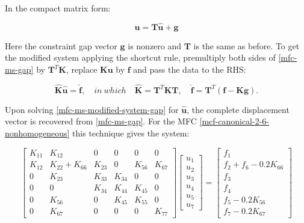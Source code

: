 \documentclass[10pt,b5paper,titlepage]{book}
\begin{document}
In the compact matrix form:

\begin{equation}\label{mfc-ms-gap}
    \mathbf{u} = \mathbf{T} \mathbf{\hat{u}} + \mathbf{g}
\end{equation}

Here the constraint gap vector $ \mathbf{g} $ is nonzero and $ \mathbf{T} $ is the same
as before. To get the modified system applying the shortcut rule, premultiply
both sides of \eqref{mfc-ms-gap} by $ \mathbf{T}^T \mathbf{K} $, replace
$ \mathbf{K} \mathbf{u} $ by $ \mathbf{f} $ and pass the data to the RHS:

\begin{equation}\label{mfc-ms-modified-system-gap}
    \mathbf{\hat{K}} \mathbf{\hat{u}} = \mathbf{\hat{f}}, \quad
    in\ which \quad \mathbf{\hat{K}} = \mathbf{T}^T \mathbf{K} \mathbf{T}, \quad
    \mathbf{\hat{f}} = \mathbf{T}^T \left( \mathbf{f} -\mathbf{K} \mathbf{g} \right).
\end{equation}

Upon solving \eqref{mfc-ms-modified-system-gap} for $ \mathbf{\hat{u}} $, the
complete displacement vector is recovered from \eqref{mfc-ms-gap}. For the MFC
\eqref{mcf-canonical-2-6-nonhomogeneous} this technique gives the system:

\begin{equation}
    \begin{bmatrix}
        K_{11} & K_{12} & 0 & 0 & 0 & 0 \\
        K_{12} & K_{22} + K_{66} & K_{23} & 0 & K_{56} & K_{67} \\
        0 & K_{23} & K_{33} & K_{34} & 0 & 0 \\
        0 & 0 & K_{34} & K_{44} & K_{45} & 0 \\
        0 & K_{56} & 0 & K_{45} & K_{55} & 0 \\
        0 & K_{67} & 0 & 0 & 0 & K_{77}
    \end{bmatrix}
    \begin{bmatrix}
        u_1 \\
        u_2 \\
        u_3 \\
        u_4 \\
        u_5 \\
        u_7
    \end{bmatrix}
    = \begin{bmatrix}
        f_1 \\
        f_2 + f_6 - 0.2 K_{66} \\
        f_3 \\
        f_4 \\
        f_5 - 0.2 K_{56} \\
        f_7 - 0.2 K_{67}
    \end{bmatrix}
\end{equation}
\end{document}
